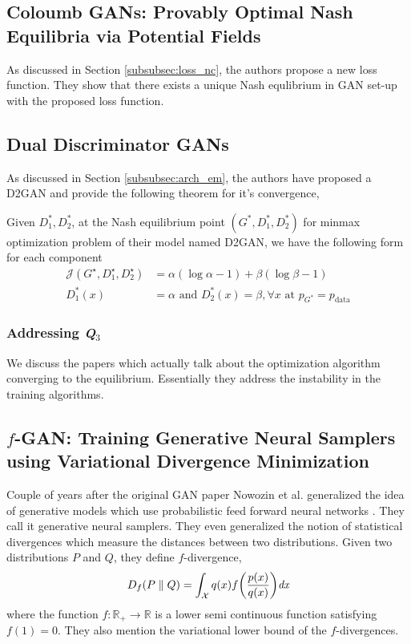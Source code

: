 \subsection*{Coloumb GANs: Provably Optimal Nash Equilibria via Potential Fields \citep{coulomb}} As discussed in Section \ref{subsubsec:loss_nc}, the authors propose a new loss function. They show that there exists a unique Nash equlibrium in GAN set-up with the proposed loss function.


\subsection*{Dual Discriminator GANs \citep{d2gan}} As discussed in Section \ref{subsubsec:arch_em}, the authors have proposed a D2GAN and provide the following theorem for it's convergence,
\begin{theorem}
Given $D_1^*, D_2^*$, at the Nash equilibrium point $(G^*, D_1^*, D_2^*)$ for minmax optimization problem of their model named D2GAN, we have the following form for each component
$$\begin{aligned} \mathcal{J}\left(G^{\star}, D_{1}^{\star}, D_{2}^{\star}\right) &=\alpha(\log \alpha-1)+\beta(\log \beta-1) \\ D_{1}^{*}(x)
&=\alpha \text { and } D_{2}^{*}(x)=\beta, \forall x \text { at } p_{G^{*}}=p_{\text {data}} \end{aligned}$$
\end{theorem}

\subsubsection{Addressing \emph{Q$_3$}} \label{subsubsec:theory_q3} We discuss the papers which actually talk about the optimization algorithm converging to the equilibrium. Essentially they address the instability in the training algorithms.


\subsection*{$f$-GAN: Training Generative Neural Samplers using Variational Divergence Minimization \citep{fgan}}
Couple of years after the original GAN paper  Nowozin et al. generalized the idea of generative models which use probabilistic feed forward neural networks \citep{fgan}. They call it generative neural samplers. They even generalized the notion of statistical divergences which measure the distances between two distributions. Given two distributions $P$ and $Q$, they define $f$-divergence, $$D_{f}(P \parallel Q) = \int_{\mathcal{X}}q(x)f \bigg( \frac{p(x)}{q(x)} \bigg) \emph{dx} $$ where the function $f : \mathbb{R}_{+} \rightarrow \mathbb{R}$ is a lower semi continuous function satisfying $f(1) = 0$. They also mention the variational lower bound of the $f$-divergences.  

